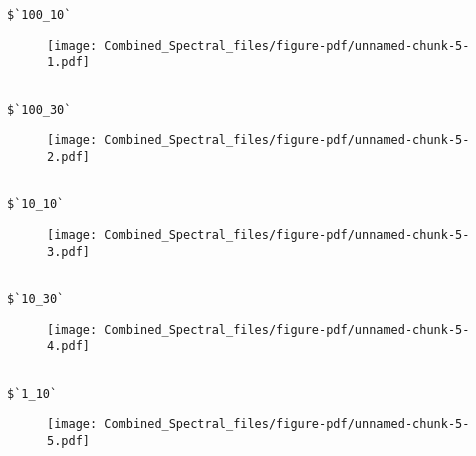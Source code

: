 \documentclass[
  letterpaper,
  DIV=11,
  numbers=noendperiod]{scrartcl}
\begin{document}
\begin{verbatim}
$`100_10`
\end{verbatim}

\begin{figure}[H]

{\centering \texttt{[image: Combined\_Spectral\_files/figure-pdf/unnamed-chunk-5-1.pdf]}

}

\end{figure}

\begin{verbatim}

$`100_30`
\end{verbatim}

\begin{figure}[H]

{\centering \texttt{[image: Combined\_Spectral\_files/figure-pdf/unnamed-chunk-5-2.pdf]}

}

\end{figure}

\begin{verbatim}

$`10_10`
\end{verbatim}

\begin{figure}[H]

{\centering \texttt{[image: Combined\_Spectral\_files/figure-pdf/unnamed-chunk-5-3.pdf]}

}

\end{figure}

\begin{verbatim}

$`10_30`
\end{verbatim}

\begin{figure}[H]

{\centering \texttt{[image: Combined\_Spectral\_files/figure-pdf/unnamed-chunk-5-4.pdf]}

}

\end{figure}

\begin{verbatim}

$`1_10`
\end{verbatim}

\begin{figure}[H]

{\centering \texttt{[image: Combined\_Spectral\_files/figure-pdf/unnamed-chunk-5-5.pdf]}

}

\end{figure}
\end{document}
